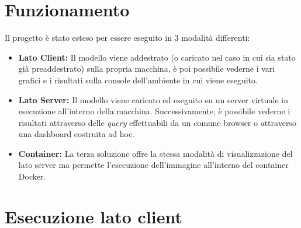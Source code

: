 \documentclass{article}
\begin{document}
\section{Funzionamento}
Il progetto è stato esteso per essere eseguito in 3 modalità differenti:
\begin{itemize}
    \item \textbf{Lato Client: }Il modello viene addestrato (o caricato nel caso in cui sia stato già preaddestrato) sulla propria macchina, è poi possibile vederne i vari grafici e i risultati sulla console dell'ambiente in cui viene eseguito.
    \item \textbf{Lato Server: }Il modello viene caricato ed eseguito su un server virtuale in esecuzione all'interno della macchina. Successivamente, è possibile vederne i risultati attraverso delle \textit{query} effettuabili da un comune browser o attraverso una dashboard costruita ad hoc. 
    \item \textbf{Container:} La terza soluzione offre la stessa modalità di visualizzazione del lato server ma permette l'esecuzione dell'immagine all'interno del container Docker.
\end{itemize}

\section{Esecuzione lato client}
\end{document}

